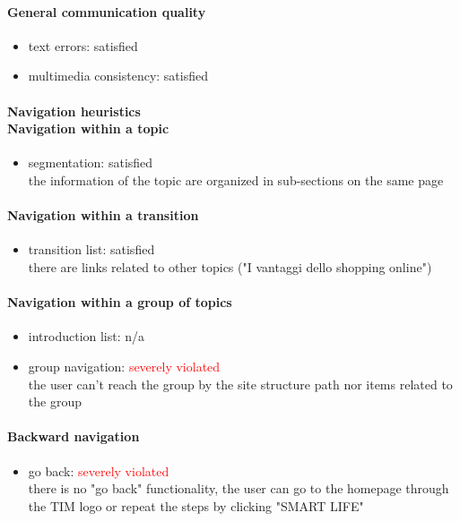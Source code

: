 \begin{enumerate}
	\paragraph*{General communication quality}
	\begin{itemize}
		\item text errors: satisfied
		\item multimedia consistency: satisfied
	\end{itemize}

	\paragraph*{Navigation heuristics \\ Navigation within a topic}
	\begin{itemize}
		\item segmentation: satisfied\\
		the information of the topic are organized in sub-sections on the same page
	\end{itemize}	

	\paragraph*{Navigation within a transition}
	\begin{itemize}
		\item transition list: satisfied\\
		there are links related to other topics ("I vantaggi dello shopping online")
	\end{itemize}

	\paragraph*{Navigation within a group of topics}
	\begin{itemize}
		\item introduction list: n/a
		\item group navigation: \textcolor{red}{severely violated}\\
		the user can't reach the group by the site structure path nor items related to the group
	\end{itemize}

	\paragraph*{Backward navigation}
	\begin{itemize}
		\item go back: \textcolor{red}{severely violated}\\
		there is no "go back" functionality, the user can go to the homepage through the TIM logo or repeat the steps by clicking "SMART LIFE"
	\end{itemize}


\end{enumerate}
